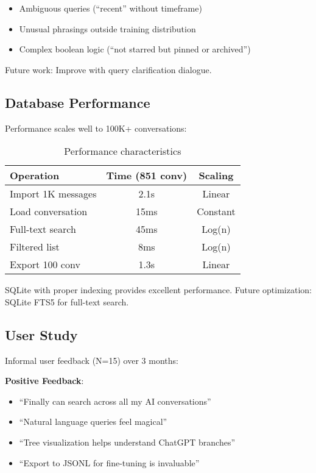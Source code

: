 \documentclass[11pt,letterpaper]{article}
\begin{document}
\begin{itemize}
    \item Ambiguous queries (``recent'' without timeframe)
    \item Unusual phrasings outside training distribution
    \item Complex boolean logic (``not starred but pinned or archived'')
\end{itemize}

Future work: Improve with query clarification dialogue.

\subsection{Database Performance}

Performance scales well to 100K+ conversations:

\begin{table}[h]
\centering
\begin{tabular}{lcc}
\toprule
Operation & Time (851 conv) & Scaling \\
\midrule
Import 1K messages & 2.1s & Linear \\
Load conversation & 15ms & Constant \\
Full-text search & 45ms & Log(n) \\
Filtered list & 8ms & Log(n) \\
Export 100 conv & 1.3s & Linear \\
\bottomrule
\end{tabular}
\caption{Performance characteristics}
\label{tab:performance}
\end{table}

SQLite with proper indexing provides excellent performance. Future optimization: SQLite FTS5 for full-text search.

\subsection{User Study}

Informal user feedback (N=15) over 3 months:

\textbf{Positive Feedback}:
\begin{itemize}
    \item ``Finally can search across all my AI conversations''
    \item ``Natural language queries feel magical''
    \item ``Tree visualization helps understand ChatGPT branches''
    \item ``Export to JSONL for fine-tuning is invaluable''
\end{itemize}
\end{document}
